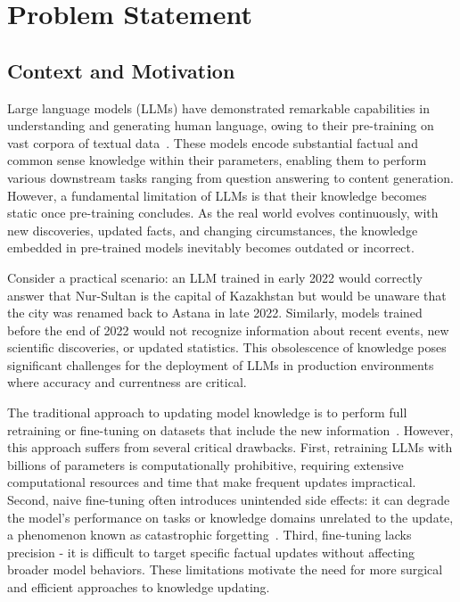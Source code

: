 \section{Problem Statement}


\subsection{Context and Motivation}

Large language models (LLMs) have demonstrated remarkable capabilities in understanding and generating human language, owing to their pre-training on vast corpora of textual data~\cite{brown2020language,devlin2019bert}. These models encode substantial factual and common sense knowledge within their parameters, enabling them to perform various downstream tasks ranging from question answering to content generation. However, a fundamental limitation of LLMs is that their knowledge becomes static once pre-training concludes. As the real world evolves continuously, with new discoveries, updated facts, and changing circumstances, the knowledge embedded in pre-trained models inevitably becomes outdated or incorrect.

Consider a practical scenario: an LLM trained in early 2022 would correctly answer that Nur-Sultan is the capital of Kazakhstan but would be unaware that the city was renamed back to Astana in late 2022. Similarly, models trained before the end of 2022 would not recognize information about recent events, new scientific discoveries, or updated statistics. This obsolescence of knowledge poses significant challenges for the deployment of LLMs in production environments where accuracy and currentness are critical.

The traditional approach to updating model knowledge is to perform full retraining or fine-tuning on datasets that include the new information~\cite{chung2024scaling}. However, this approach suffers from several critical drawbacks. First, retraining LLMs with billions of parameters is computationally prohibitive, requiring extensive computational resources and time that make frequent updates impractical. Second, naive fine-tuning often introduces unintended side effects: it can degrade the model's performance on tasks or knowledge domains unrelated to the update, a phenomenon known as catastrophic forgetting~\cite{luo2025empirical}. Third, fine-tuning lacks precision - it is difficult to target specific factual updates without affecting broader model behaviors. These limitations motivate the need for more surgical and efficient approaches to knowledge updating.

